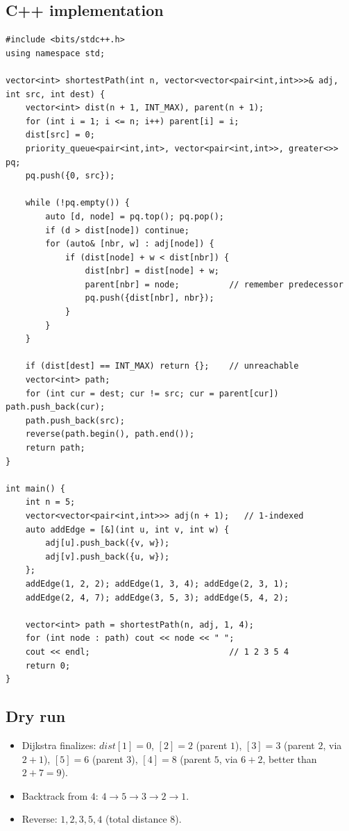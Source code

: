 \subsection*{C++ implementation}

\begin{lstlisting}
#include <bits/stdc++.h>
using namespace std;

vector<int> shortestPath(int n, vector<vector<pair<int,int>>>& adj, int src, int dest) {
    vector<int> dist(n + 1, INT_MAX), parent(n + 1);
    for (int i = 1; i <= n; i++) parent[i] = i;
    dist[src] = 0;
    priority_queue<pair<int,int>, vector<pair<int,int>>, greater<>> pq;
    pq.push({0, src});

    while (!pq.empty()) {
        auto [d, node] = pq.top(); pq.pop();
        if (d > dist[node]) continue;
        for (auto& [nbr, w] : adj[node]) {
            if (dist[node] + w < dist[nbr]) {
                dist[nbr] = dist[node] + w;
                parent[nbr] = node;          // remember predecessor
                pq.push({dist[nbr], nbr});
            }
        }
    }

    if (dist[dest] == INT_MAX) return {};    // unreachable
    vector<int> path;
    for (int cur = dest; cur != src; cur = parent[cur]) path.push_back(cur);
    path.push_back(src);
    reverse(path.begin(), path.end());
    return path;
}

int main() {
    int n = 5;
    vector<vector<pair<int,int>>> adj(n + 1);   // 1-indexed
    auto addEdge = [&](int u, int v, int w) {
        adj[u].push_back({v, w});
        adj[v].push_back({u, w});
    };
    addEdge(1, 2, 2); addEdge(1, 3, 4); addEdge(2, 3, 1);
    addEdge(2, 4, 7); addEdge(3, 5, 3); addEdge(5, 4, 2);

    vector<int> path = shortestPath(n, adj, 1, 4);
    for (int node : path) cout << node << " ";
    cout << endl;                            // 1 2 3 5 4
    return 0;
}
\end{lstlisting}

\subsection*{Dry run}


\begin{itemize}
  \item Dijkstra finalizes: $\textit{dist}[1]=0$, $[2]=2$ (parent
        $1$), $[3]=3$ (parent $2$, via $2\!+\!1$), $[5]=6$ (parent
        $3$), $[4]=8$ (parent $5$, via $6\!+\!2$, better than
        $2\!+\!7=9$).
  \item Backtrack from $4$: $4\to5\to3\to2\to1$.
  \item Reverse: $1,2,3,5,4$ (total distance $8$).
\end{itemize}

